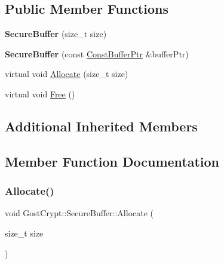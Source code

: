 \subsection*{Public Member Functions}
\begin{DoxyCompactItemize}
\item 
\mbox{\label{class_gost_crypt_1_1_secure_buffer_a5e918227d8d7c3acc9e061da822788c0}} 
{\bfseries Secure\+Buffer} (size\+\_\+t size)
\item 
\mbox{\label{class_gost_crypt_1_1_secure_buffer_aed4b5bfdb7eb6a9c87d5a4badd0c134d}} 
{\bfseries Secure\+Buffer} (const \hyperlink{class_gost_crypt_1_1_const_buffer_ptr}{Const\+Buffer\+Ptr} \&buffer\+Ptr)
\item 
virtual void \hyperlink{class_gost_crypt_1_1_secure_buffer_a626b41ebc4eec26e6968bcead2f26966}{Allocate} (size\+\_\+t size)
\item 
virtual void \hyperlink{class_gost_crypt_1_1_secure_buffer_abaf33112f3fc29a54177f2f32e0148e8}{Free} ()
\end{DoxyCompactItemize}
\subsection*{Additional Inherited Members}


\subsection{Member Function Documentation}
\mbox{\label{class_gost_crypt_1_1_secure_buffer_a626b41ebc4eec26e6968bcead2f26966}} 
\subsubsection{\texorpdfstring{Allocate()}{Allocate()}}
{\footnotesize\ttfamily void Gost\+Crypt\+::\+Secure\+Buffer\+::\+Allocate (\begin{DoxyParamCaption}\item[{size\+\_\+t}]{size }\end{DoxyParamCaption})\hspace{0.3cm}{\ttfamily [virtual]}}


